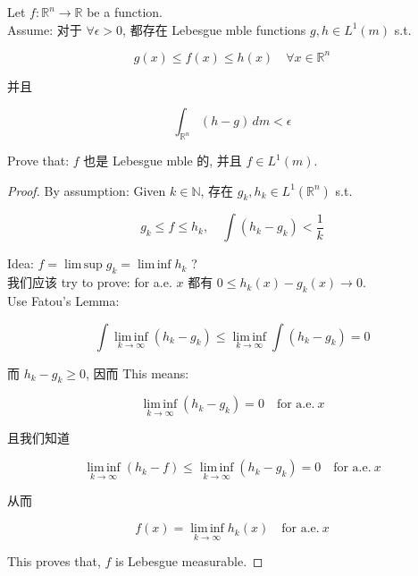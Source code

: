 \documentclass{qlnotes-export}
\begin{document}
\begin{example}\label{ex-lec36-problem-solving-example-002}

Let \(f:{\mathbb{R}}^{n}\rightarrow{\mathbb{R}}\) be a function.\\
Assume: 对于 \(\forall\epsilon > 0\), 都存在 Lebesgue mble functions \(g,h \in L^{1}(m)\) s.t.

\[g(x) \leq f(x) \leq h(x)\quad\forall x \in {\mathbb{R}}^{n}\]

并且

\[\int_{{\mathbb{R}}^{n}}(h - g)\, dm < \epsilon\]

Prove that: \(f\) 也是 Lebesgue mble 的, 并且 \(f \in L^{1}(m)\).\\

\end{example}

\begin{proof}

By assumption: Given \(k \in {\mathbb{N}}\), 存在 \(g_{k},h_{k} \in L^{1}({\mathbb{R}}^{n})\) s.t.

\[g_{k} \leq f \leq h_{k},\quad\int(h_{k} - g_{k}) < \frac{1}{k}\]

Idea: \(f = \operatorname{lim\, sup}g_{k} = \operatorname{lim\, inf}h_{k}\) ?\\
我们应该 try to prove: for a.e. \(x\) 都有 \(0 \leq h_{k}(x) - g_{k}(x)\rightarrow 0\).\\
Use Fatou's Lemma:

\[\int\operatorname{lim\, inf}\limits_{k\rightarrow\infty}(h_{k} - g_{k}) \leq \operatorname{lim\, inf}\limits_{k\rightarrow\infty}\int(h_{k} - g_{k}) = 0\]

而 \(h_{k} - g_{k} \geq 0\), 因而 This means:

\[\operatorname{lim\, inf}\limits_{k\rightarrow\infty}(h_{k} - g_{k}) = 0\quad\text{for a.e.}\ x\]

且我们知道

\[\operatorname{lim\, inf}\limits_{k\rightarrow\infty}(h_{k} - f) \leq \operatorname{lim\, inf}\limits_{k\rightarrow\infty}(h_{k} - g_{k}) = 0\quad\text{for a.e.}\ x\]

从而

\[f(x) = \operatorname{lim\, inf}\limits_{k\rightarrow\infty}h_{k}(x)\quad\text{for a.e.}\ x\]

This proves that, \(f\) is Lebesgue measurable.

\end{proof}
\end{document}
